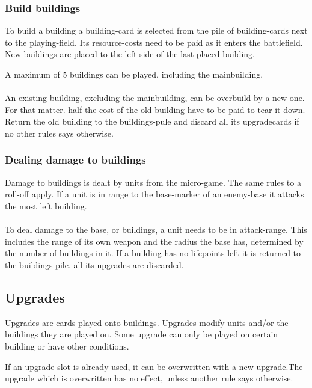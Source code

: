\documentclass[a5paper,pagesize,10pt,bibtotoc,pointlessnumbers,
normalheadings,DIV=9,twoside=false]{scrbook}
\begin{document}
\subsubsection{Build buildings}
To build a building a building-card is selected from the pile of building-cards next to the playing-field. Its resource-costs need to be paid as it enters the battlefield.
New buildings are placed to the left side of the last placed building.

A maximum of 5 buildings can be played, including the mainbuilding.\\
\\
An existing building, excluding the mainbuilding, can be overbuild by a new one. For that matter. half the cost of the old building have to be paid to tear it down. Return the old building to the buildings-pule and discard all its upgradecards if no other rules says otherwise.

\subsubsection{Dealing damage to buildings}
Damage to buildings is dealt by units from the micro-game. The same rules to a roll-off apply. If a unit is in range to the base-marker of an enemy-base it attacks the most left building.\\
\\
To deal damage to the base, or buildings, a unit needs to be in attack-range. This includes the range of its own weapon and the radius the base has, determined by the number of buildings in it.
If a building has no lifepoints left it is returned to the buildings-pile. all its upgrades are discarded.

\subsection{Upgrades}
Upgrades are cards played onto buildings. Upgrades modify units and/or the buildings they are played on. Some upgrade can only be played on certain building or have other conditions.

If an upgrade-slot is already used, it can be overwritten with a new upgrade.The upgrade which is overwritten has no effect, unless another rule says otherwise.\\
\end{document}
